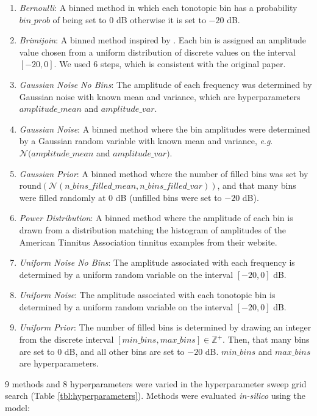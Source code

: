 \documentclass[journal]{IEEEtran}
\newcommand{\eg}{\textit{e}.\textit{g}.\ }
\begin{document}
\begin{enumerate}
  \item \textit{Bernoulli}: A binned method in which each tonotopic bin
  has a probability $bin \_ prob$ of being set to $0$ dB otherwise it is set to $-20$ dB.
  \item \textit{Brimijoin}: A binned method inspired by \cite{brimijoinInternalRepresentationVowel2013}.
  Each bin is assigned an amplitude value chosen from a uniform distribution of discrete values
  on the interval $[-20, 0]$. We used $6$ steps, which is consistent with the original paper.
  \item \textit{Gaussian Noise No Bins}: The amplitude of each frequency was determined by
  Gaussian noise with known mean and variance, which are hyperparameters $amplitude \_ mean$ and $amplitude \_ var$.
  \item \textit{Gaussian Noise}: A binned method where the bin amplitudes were
  determined by a Gaussian random variable with known mean and variance, \eg $\mathcal{N}(amplitude \_ mean$ and $amplitude \_ var)$.
  \item \textit{Gaussian Prior}: A binned method where the number of filled bins
  was set by $\mathrm{round}(\mathcal{N}(n \_ bins \_ filled \_ mean, n \_ bins \_ filled \_ var))$,
  and that many bins were filled randomly at $0$ dB (unfilled bins were set to $-20$ dB).
  \item \textit{Power Distribution}: A binned method where the amplitude of each bin
  is drawn from a distribution matching the histogram of amplitudes
  of the American Tinnitus Association tinnitus examples from their website.
  \item \textit{Uniform Noise No Bins}: The amplitude associated with each frequency
  is determined by a uniform random variable on the interval $[-20, 0]$ dB.
  \item \textit{Uniform Noise}: The amplitude associated with each tonotopic bin
  is determined by a uniform random variable on the interval $[-20, 0]$ dB.
  \item \textit{Uniform Prior}: The number of filled bins is determined by drawing an integer
  from the discrete interval $[min \_ bins, max \_ bins] \in \mathbb{Z}^+$. Then, that many bins are set to $0$ dB,
  and all other bins are set to $-20$ dB. $min \_ bins$ and $max \_ bins$ are hyperparameters.
\end{enumerate}

9 methods and 8 hyperparameters were varied in the hyperparameter sweep grid search (Table \ref{tbl:hyperparameters}).
Methods were evaluated \textit{in-silico} using the model:
\end{document}
